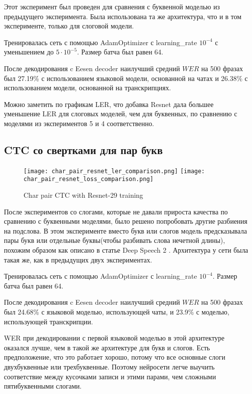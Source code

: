 \documentclass[a4paper,14pt]{extarticle}
\begin{document}
Этот эксперимент был проведен для сравнения с буквенной моделью из предыдущего эксперимента. Была использована та же архитектура, что и в том эксперименте, только для слоговой модели.

Тренировалась сеть с помощью AdamOptimizer с learning\_rate $10^{-4}$ с уменьшением до $5\cdot10^{-5}$. Размер батча был равен 64. 

После декодирования c Eesen decoder наилучший средний $WER$ на 500 фразах был 27.19\% с использованием языковой модели, основанной на чатах и 26.38\% с использованием модели, основанной на транскрипциях.

Можно заметить по графикам LER, что добавка Resnet дала большее уменьшение LER для слоговых моделей, чем для буквенных, по сравнению с моделями из экспериментов 5 и 4 соответственно. 

\subsection{CTC со свертками для пар букв}
\begin{figure}[!ht]
	\texttt{[image: char\_pair\_resnet\_ler\_comparison.png]}%
	\texttt{[image: char\_pair\_resnet\_loss\_comparison.png]}
	\caption{Char pair CTC with Resnet-29 training}
	\label{char_pair_resnet_train}
\end{figure}
После экспериментов со слогами, которые не давали прироста качества по сравнению с буквенными моделями, было решено попробовать другие разбиения на подслова.
В этом эксперименте вместо букв или слогов модель предсказывала пары букв или отдельные буквы(чтобы разбивать слова нечетной длины), похожим образом как описано в статье Deep Speech 2 \cite{deep_speech2}. Архитектура у сети была такая же, как в предыдущих двух экспериментах. 

Тренировалась сеть с помощью AdamOptimizer с learning\_rate $10^{-4}$. Размер батча был равен 64. 

После декодирования c Eesen decoder наилучший средний $WER$ на 500 фразах был 24.68\% с языковой моделью, использующей чаты, и 23.9\% с моделью, использующей транскрипции.

WER при декодировании с первой языковой моделью в этой архитектуре оказался лучше, чем в такой же архитектуре для букв и слогов. Есть предположение, что это работает хорошо, потому что все основные слоги двухбуквенные или трехбуквенные. Поэтому нейросети легче выучить соответствие между кусочками записи и этими парами, чем сложными пятибуквенными слогами.
\end{document}
